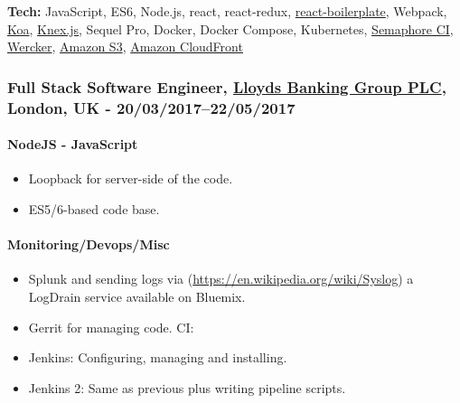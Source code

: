 \documentclass[
  a4paper,
]{article}
\providecommand{\tightlist}{%
  \setlength{\itemsep}{0pt}\setlength{\parskip}{0pt}}
\begin{document}
\begin{multicols*}{2}
\textbf{Tech:} JavaScript, ES6, Node.js, react, react-redux,
\href{https://www.reactboilerplate.com/}{react-boilerplate}, Webpack,
\href{http://koajs.com}{Koa}, \href{http://knexjs.org/}{Knex.js}, Sequel
Pro, Docker, Docker Compose, Kubernetes,
\href{https://semaphoreci.com}{Semaphore CI},
\href{http://www.wercker.com/}{Wercker},
\href{https://aws.amazon.com/s3/}{Amazon S3},
\href{http://aws.amazon.com/cloudfront/}{Amazon CloudFront}

\hypertarget{full-stack-software-engineer-lloyds-banking-group-plc-london-uk---2003201722052017}{%
\subsubsection{\texorpdfstring{Full Stack Software Engineer,
\href{https://www.lloydsbankinggroup.com}{Lloyds Banking Group PLC},
London, UK -
20/03/2017--22/05/2017}{Full Stack Software Engineer, Lloyds Banking Group PLC, London, UK - 20/03/2017--22/05/2017}}\label{full-stack-software-engineer-lloyds-banking-group-plc-london-uk---2003201722052017}}

\hypertarget{nodejs---javascript}{%
\paragraph{NodeJS - JavaScript}\label{nodejs---javascript}}

\begin{itemize}
\tightlist
\item
  Loopback for server-side of the code.
\item
  ES5/6-based code base.
\end{itemize}

\hypertarget{monitoringdevopsmisc}{%
\paragraph{Monitoring/Devops/Misc}\label{monitoringdevopsmisc}}

\begin{itemize}
\tightlist
\item
  Splunk and sending logs via
  (\url{https://en.wikipedia.org/wiki/Syslog}) a LogDrain service
  available on Bluemix.
\item
  Gerrit for managing code. CI:
\item
  Jenkins: Configuring, managing and installing.
\item
  Jenkins 2: Same as previous plus writing pipeline scripts.
\end{itemize}


\end{multicols*}
\end{document}
